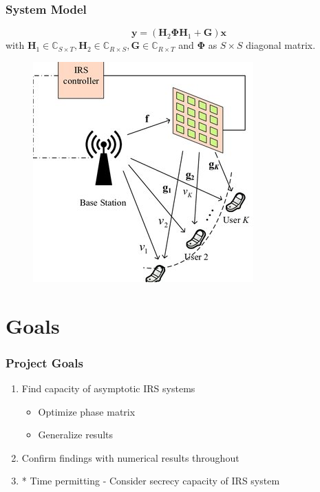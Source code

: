\documentclass[10pt,tgadventor, onlymath]{beamer}
\begin{document}
\begin{frame}
\frametitle{System Model}
\centering
\begin{equation}
	\mathbf{y} = (\mathbf{H}_2\boldsymbol{\Phi}\mathbf{H}_1 + \mathbf{G})\mathbf{x}
\end{equation}
with 
$\mathbf{H}_{1}\in \mathbb{C}_{S \times T},\mathbf{H}_{2} \in \mathbb{C}_{R \times S}, \mathbf{G} \in \mathbb{C}_{R \times T}$ and $\boldsymbol{\Phi}$ as $S \times S$ diagonal matrix.

	\begin{figure}
		\centering
		\includegraphics[scale=1]{irs}
	\end{figure}
\end{frame}

\section{Goals}
\begin{frame}
\frametitle{Project Goals}
\begin{enumerate}
\item
	Find capacity of asymptotic IRS systems
	\begin{itemize}
	\item 
		Optimize phase matrix
	\item
		Generalize results
	\end{itemize}

\item 
	Confirm findings with numerical results throughout
	
\item
	* Time permitting - Consider secrecy capacity of IRS system
\end{enumerate}
\end{frame}
\end{document}
